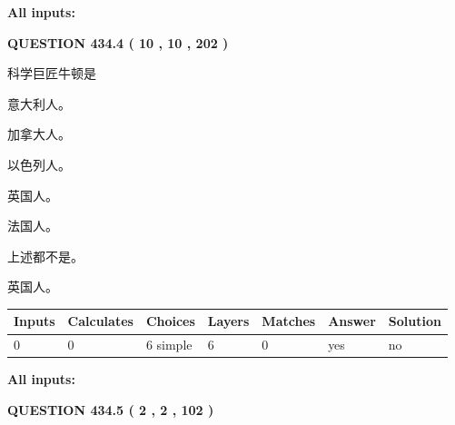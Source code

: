 \documentclass{ctexart}
\begin{document}
   
   
   
\noindent\vspace{0.1in}\hspace{-0.08in} {\textbf{\Large{All inputs: }}}
   
   
  
\vspace{0.2in}
  
{\textbf{\Large{QUESTION
434.4 
 ( 10 , 10 , 202 )
}}}
  
  
科学巨匠牛顿是
 
 
意大利人。
 
 
加拿大人。
 
 
以色列人。
 
 
英国人。
 
 
法国人。
 
 
 上述都不是。
 
 
\noindent{}
 
 
英国人。
 
 
\noindent{}
 
 
   
   
   
   
\noindent\begin{tabular}{|l|l|l|l|l|l|l|}
 \hline
Inputs & Calculates & Choices & Layers & Matches & Answer & Solution \\ \hline
 0  & 
 0  & 
 6
  simple  
  & 
 6  & 
 0  & 
  yes & 
  no 
  \\ \hline
 \end{tabular}
   
   
   
   
\noindent{}
   
   
   
   
\noindent\vspace{0.1in}\hspace{-0.08in} {\textbf{\Large{All inputs: }}}
   
   
  
\vspace{0.2in}
  
{\textbf{\Large{QUESTION
434.5 
 ( 2 , 2 , 102 )
}}}
  
\end{document}
